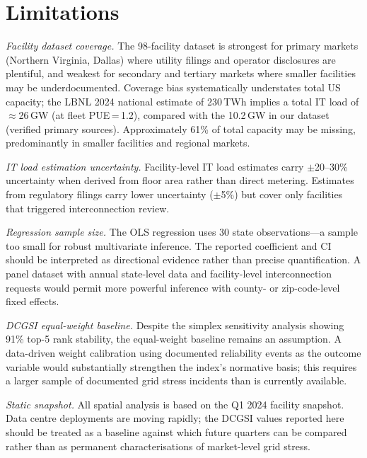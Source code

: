 \documentclass[preprint,12pt]{elsarticle}
\begin{document}
\section{Limitations}
\label{sec:limitations}

\textit{Facility dataset coverage.} The 98-facility dataset is strongest
for primary markets (Northern Virginia, Dallas) where utility filings
and operator disclosures are plentiful, and weakest for secondary and
tertiary markets where smaller facilities may be underdocumented.
Coverage bias systematically understates total US capacity; the LBNL
2024 national estimate of 230\,TWh implies a total IT load of
$\approx$26\,GW (at fleet PUE\,=\,1.2), compared with the 10.2\,GW in
our dataset (verified primary sources). Approximately 61\% of total capacity
may be missing, predominantly in smaller facilities and regional markets.

\textit{IT load estimation uncertainty.} Facility-level IT load estimates
carry $\pm$20--30\% uncertainty when derived from floor area rather than
direct metering. Estimates from regulatory filings carry lower uncertainty
($\pm$5\%) but cover only facilities that triggered interconnection review.

\textit{Regression sample size.} The OLS regression uses 30 state
observations---a sample too small for robust multivariate inference.
The reported coefficient and CI should be interpreted as directional
evidence rather than precise quantification. A panel dataset with
annual state-level data and facility-level interconnection requests
would permit more powerful inference with county- or zip-code-level
fixed effects.

\textit{DCGSI equal-weight baseline.} Despite the simplex sensitivity
analysis showing 91\% top-5 rank stability, the equal-weight baseline
remains an assumption. A data-driven weight calibration using documented
reliability events as the outcome variable would substantially strengthen
the index's normative basis; this requires a larger sample of documented
grid stress incidents than is currently available.

\textit{Static snapshot.} All spatial analysis is based on the Q1 2024
facility snapshot. Data centre deployments are moving rapidly; the DCGSI
values reported here should be treated as a baseline against which future
quarters can be compared rather than as permanent characterisations of
market-level grid stress.
\end{document}
